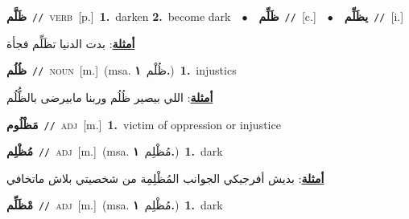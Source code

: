 \documentclass[10pt,a4paper,twoside]{article} %
\begin{document}
\begin{multicols}{2}
{\setlength\topsep{0pt}\textbf{\foreignlanguage{arabic}{ظَلَّم}}\ {\color{gray}\texttt{//}\color{black}}\ \textsc{verb}\ [p.]\ \textbf{1.}~darken  \textbf{2.}~become dark\ \ $\bullet$\ \ \setlength\topsep{0pt}\textbf{\foreignlanguage{arabic}{ظَلِّم}}\ {\color{gray}\texttt{//}\color{black}}\ [c.]\ \ $\bullet$\ \ \setlength\topsep{0pt}\textbf{\foreignlanguage{arabic}{يظَلِّم}}\ {\color{gray}\texttt{//}\color{black}}\ [i.]\  \begin{flushright}\color{gray}\foreignlanguage{arabic}{\textbf{\underline{\foreignlanguage{arabic}{أمثلة}}}: بدت الدنيا تظَلِّم فجأة}\end{flushright}\color{black}} \vspace{2mm}

{\setlength\topsep{0pt}\textbf{\foreignlanguage{arabic}{ظُلُم}}\ {\color{gray}\texttt{//}\color{black}}\ \textsc{noun}\ [m.]\ \color{gray}(msa. \foreignlanguage{arabic}{ظُلْم}~\foreignlanguage{arabic}{\textbf{١.}})\color{black}\ \textbf{1.}~injustics\  \begin{flushright}\color{gray}\foreignlanguage{arabic}{\textbf{\underline{\foreignlanguage{arabic}{أمثلة}}}: اللي بيصير ظُلُم وربنا مابيرضى بالظُّلُم}\end{flushright}\color{black}} \vspace{2mm}

{\setlength\topsep{0pt}\textbf{\foreignlanguage{arabic}{مَظْلُوم}}\ {\color{gray}\texttt{//}\color{black}}\ \textsc{adj}\ [m.]\ \textbf{1.}~victim of oppression or injustice\ } \vspace{2mm}

{\setlength\topsep{0pt}\textbf{\foreignlanguage{arabic}{مُظْلِم}}\ {\color{gray}\texttt{//}\color{black}}\ \textsc{adj}\ [m.]\ \color{gray}(msa. \foreignlanguage{arabic}{مُظْلِم}~\foreignlanguage{arabic}{\textbf{١.}})\color{black}\ \textbf{1.}~dark\  \begin{flushright}\color{gray}\foreignlanguage{arabic}{\textbf{\underline{\foreignlanguage{arabic}{أمثلة}}}: بديش أفرجيكي الجوانب المُظْلِمِة من شخصيتي بلاش ماتخافي}\end{flushright}\color{black}} \vspace{2mm}

{\setlength\topsep{0pt}\textbf{\foreignlanguage{arabic}{مْظَلِّم}}\ {\color{gray}\texttt{//}\color{black}}\ \textsc{adj}\ [m.]\ \color{gray}(msa. \foreignlanguage{arabic}{مُظْلِم}~\foreignlanguage{arabic}{\textbf{١.}})\color{black}\ \textbf{1.}~dark\ } \vspace{2mm}


\end{multicols}
\end{document}
